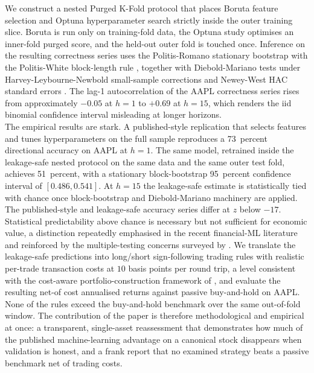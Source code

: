 \documentclass{rQUF2e}
\begin{document}
\noindent We construct a nested Purged K-Fold protocol that places
Boruta feature selection and Optuna hyperparameter search strictly
inside the outer training slice. Boruta is run only on
training-fold data, the Optuna study optimises an inner-fold purged
score, and the held-out outer fold is touched once. Inference on
the resulting correctness series uses the Politis-Romano stationary
bootstrap with the Politis-White block-length rule
\citep{politis1994stationary,politis2004automatic,patton2009correction},
together with Diebold-Mariano tests under Harvey-Leybourne-Newbold
small-sample corrections \citep{diebold1995comparing,harvey1997testing}
and Newey-West HAC standard errors \citep{newey1987simple}. The lag-1
autocorrelation of the AAPL correctness series rises from
approximately $-0.05$ at $h=1$ to $+0.69$ at $h=15$, which renders
the iid binomial confidence interval misleading at longer horizons.
\\

\noindent The empirical results are stark. A published-style
replication that selects features and tunes hyperparameters on the
full sample reproduces a 73~percent directional accuracy on AAPL at
$h=1$. The same model, retrained inside the leakage-safe nested
protocol on the same data and the same outer test fold, achieves
51~percent, with a stationary block-bootstrap 95~percent confidence
interval of $[0.486, 0.541]$. At $h=15$ the leakage-safe estimate
is statistically tied with chance once block-bootstrap and
Diebold-Mariano machinery are applied. The published-style and
leakage-safe accuracy series differ at $z$ below $-17$. \\

\noindent Statistical predictability above chance is necessary but
not sufficient for economic value, a distinction repeatedly
emphasised in the recent financial-ML literature
\citep{avramov2023machine,kelly2023financial} and reinforced by
the multiple-testing concerns surveyed by \citet{harvey2016cross}.
We translate the leakage-safe predictions into long/short
sign-following trading rules with realistic per-trade transaction
costs at $10$ basis points per round trip, a level consistent with
the cost-aware portfolio-construction framework of
\citet{demiguel2020transaction}, and evaluate the resulting net-of
cost annualised returns against passive buy-and-hold on AAPL. None
of the rules exceed the buy-and-hold benchmark over the same
out-of-fold window.
The contribution of the paper is therefore methodological and
empirical at once: a transparent, single-asset reassessment that
demonstrates how much of the published machine-learning advantage
on a canonical stock disappears when validation is honest, and a
frank report that no examined strategy beats a passive benchmark
net of trading costs. \\
\end{document}
